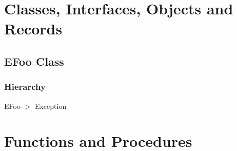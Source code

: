 \documentclass{report}
\begin{document}
\section{Classes, Interfaces, Objects and Records}
\subsection*{EFoo Class}
\subsubsection*{\large{\textbf{Hierarchy}}\normalsize\hspace{1ex}\hfill}
EFoo {$>$} Exception
\section{Functions and Procedures}
\end{document}
